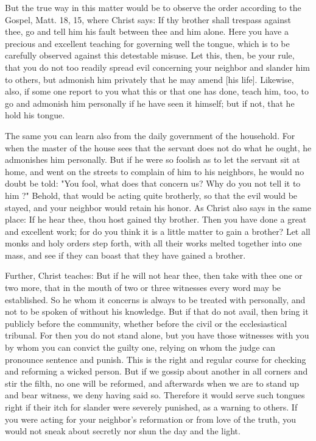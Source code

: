But the true way in this matter would be to observe the order
according to the Gospel, Matt. 18, 15, where Christ says: If thy
brother shall trespass against thee, go and tell him his fault between
thee and him alone. Here you have a precious and excellent teaching for
governing well the tongue, which is to be carefully observed against
this detestable misuse. Let this, then, be your rule, that you do not
too readily spread evil concerning your neighbor and slander him to
others, but admonish him privately that he may amend [his life].
Likewise, also, if some one report to you what this or that one has
done, teach him, too, to go and admonish him personally if he have seen
it himself; but if not, that he hold his tongue.

The same you can learn also from the daily government of the
household. For when the master of the house sees that the servant does
not do what he ought, he admonishes him personally. But if he were so
foolish as to let the servant sit at home, and went on the streets to
complain of him to his neighbors, he would no doubt be told: "You fool,
what does that concern us? Why do you not tell it to him ?" Behold,
that would be acting quite brotherly, so that the evil would be stayed,
and your neighbor would retain his honor. As Christ also says in the
same place: If he hear thee, thou host gained thy brother. Then you
have done a great and excellent work; for do you think it is a little
matter to gain a brother? Let all monks and holy orders step forth,
with all their works melted together into one mass, and see if they
can boast that they have gained a brother.

Further, Christ teaches: But if he will not hear thee, then take with
thee one or two more, that in the mouth of two or three witnesses every
word may be established. So he whom it concerns is always to be treated
with personally, and not to be spoken of without his knowledge. But if
that do not avail, then bring it publicly before the community, whether
before the civil or the ecclesiastical tribunal. For then you do not
stand alone, but you have those witnesses with you by whom you can
convict the guilty one, relying on whom the judge can pronounce
sentence and punish. This is the right and regular course for checking
and reforming a wicked person. But if we gossip about another in all
corners and stir the filth, no one will be reformed, and afterwards
when we are to stand up and bear witness, we deny having said so.
Therefore it would serve such tongues right if their itch for slander
were severely punished, as a warning to others. If you were acting for
your neighbor's reformation or from love of the truth, you would not
sneak about secretly nor shun the day and the light.


